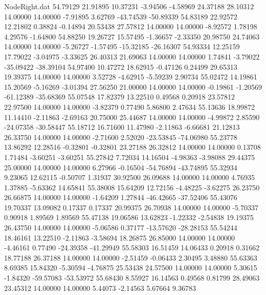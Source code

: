 \begin{filecontents}{NodeRight.dat}
  54.79129   21.91895   10.37231    -3.94506   -4.58969   24.37188   28.10312   14.00000   14.00000   -7.91895    3.62769  -43.74539  -50.89339
  54.83189   22.92572   12.21802     0.38824   -0.14894   20.53438   27.57812   14.00000   14.00000   -8.92572    1.78198    4.29576   -1.64800
  54.88250   19.26727   15.57495    -1.36657   -2.33350   20.98750   24.74063   14.00000   14.00000   -5.26727   -1.57495  -15.32185  -26.16307
  54.93334   12.25159   17.79022    -3.04975   -3.33625   26.40313   21.69063   14.00000   14.00000    1.74841   -3.79022  -35.09422  -38.39104
  54.97400   10.47272   18.62915    -0.47126    0.24499   29.65313   19.39375   14.00000   14.00000    3.52728   -4.62915   -5.59239    2.90734
  55.02472   14.19861   15.20569    -5.16269   -3.01394   27.56250   21.00000   14.00000   14.00000   -0.19861   -1.20569  -61.12389  -35.68369
  55.07548   17.82379   13.22510     0.49568    0.20918   23.57812   22.97500   14.00000   14.00000   -3.82379    0.77490    5.86800    2.47634
  55.13636   18.99872   11.14410    -2.11863   -2.69163   20.75000   25.44687   14.00000   14.00000   -4.99872    2.85590  -24.07358  -30.58447
  55.18712   16.71600   11.47980    -2.11863   -6.66681   21.12813   26.33750   14.00000   14.00000   -2.71600    2.52020  -23.53845  -74.06980
  55.23778   13.86292   12.28516    -0.32801   -0.32801   23.27188   26.32812   14.00000   14.00000    0.13708    1.71484   -3.60251   -3.60251
  55.27842    7.72034   14.16504    -4.98363   -3.98088   29.44375   25.00000   14.00000   14.00000    6.27966   -0.16504  -54.76894  -43.74895
  55.32934    9.23065   12.62115    -0.50707    1.31937   30.92500   26.09688   14.00000   14.00000    4.76935    1.37885   -5.63362   14.65841
  55.38008   15.64209   12.72156    -4.48225   -3.62275   26.23750   26.66875   14.00000   14.00000   -1.64209    1.27844  -46.42665  -37.52406
  55.43076   19.70337   13.09082     0.17337    0.17337   20.99375   26.70938   14.00000   14.00000   -5.70337    0.90918    1.89569    1.89569
  55.47138   19.06586   13.62823    -1.22332   -2.54838   19.19375   26.43750   14.00000   14.00000   -5.06586    0.37177  -13.57620  -28.28153
  55.54244   18.46161   13.22510    -2.11863   -3.58694   18.26875   26.85000   14.00000   14.00000   -4.46161    0.77490  -24.39358  -41.29949
  55.58303   16.51459   14.06433     0.20918    0.31662   18.77188   26.37188   14.00000   14.00000   -2.51459   -0.06433    2.30495    3.48880
  55.63363    8.69385   15.84320    -5.30594   -4.76875   25.53438   24.57500   14.00000   14.00000    5.30615   -1.84320  -59.57083  -53.53972
  55.68430    8.55927   16.14563     0.49568    0.81799   28.49063   23.45312   14.00000   14.00000    5.44073   -2.14563    5.67664    9.36783

\end{filecontents}
